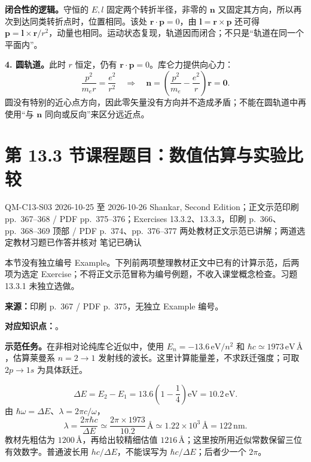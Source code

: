 \begin{checkedsolution}
\textbf{闭合性的逻辑。}守恒的 $E,l$ 固定两个转折半径，非零的 $\mathbf n$ 又固定其方向，所以再次到达同类转折点时，位置相同。该处 $\mathbf r\cdot\mathbf p=0$，由 $\mathbf l=\mathbf r\times\mathbf p$ 还可得 $\mathbf p=\mathbf l\times\mathbf r/r^2$，动量也相同。运动状态复现，轨道因而闭合；不只是“轨道在同一个平面内”。

\textbf{4. 圆轨道。}此时 $r$ 恒定，仍有 $\mathbf r\cdot\mathbf p=0$。库仑力提供向心力：
\begin{equation}
  \frac{p^2}{m_er}=\frac{e^2}{r^2}
  \quad\Longrightarrow\quad
  \mathbf n=\left(\frac{p^2}{m_e}-\frac{e^2}{r}\right)\mathbf r
    =\boxed{\mathbf 0}.
\end{equation}
圆没有特别的近心点方向，因此零矢量没有方向并不造成矛盾；不能在圆轨道中再使用“与 $\mathbf n$ 同向或反向”来区分远近点。
\end{checkedsolution}

\section{第 13.3 节课程题目：数值估算与实验比较}
\label{exercises:QM-C13-S03}
\exercisemeta
  {QM-C13-S03}
  {2026-10-25 至 2026-10-26}
  {Shankar, Second Edition；正文示范印刷 pp.~367--368 / PDF pp.~375--376；Exercises 13.3.2、13.3.3，印刷 p.~366、pp.~368--369 顶部 / PDF p.~374、pp.~376--377}
  {两处教材正文示范已讲解；两道选定教材习题已作答并核对}
  {笔记已确认}

本节没有独立编号 Example。下列前两项整理教材正文中已有的计算示范，后两项为选定 Exercise；不将正文示范冒称为编号例题，不收入课堂概念检查。习题 13.3.1 未独立选做。

\textbf{来源：}印刷 p.~367 / PDF p.~375，无独立 Example 编号。

\textbf{对应知识点：}。

\textbf{示范任务。}在非相对论纯库仑近似中，使用 $E_n=-13.6\,\mathrm{eV}/n^2$ 和 $\hbar c\simeq1973\,\mathrm{eV}\,\text{\AA}$，估算莱曼系 $n=2\to1$ 发射线的波长。这里计算能量差，不求跃迁强度；可取 $2p\to1s$ 为具体跃迁。

\begin{checkedsolution}
\begin{equation}
  \Delta E=E_2-E_1=13.6\left(1-\frac14\right)\mathrm{eV}
     =10.2\,\mathrm{eV}.
\end{equation}
由 $\hbar\omega=\Delta E$、$\lambda=2\pi c/\omega$，
\begin{equation}
  \boxed{\lambda=\frac{2\pi\hbar c}{\Delta E}
    \simeq\frac{2\pi\times1973}{10.2}\,\text{\AA}
    \simeq1.22\times10^3\,\text{\AA}=122\,\mathrm{nm}.}
\end{equation}
教材先粗估为 $1200\,\text{\AA}$，再给出较精细估值 $1216\,\text{\AA}$；这里按所用近似常数保留三位有效数字。普通波长用 $hc/\Delta E$，不能误写为 $\hbar c/\Delta E$；后者少一个 $2\pi$。
\end{checkedsolution}

